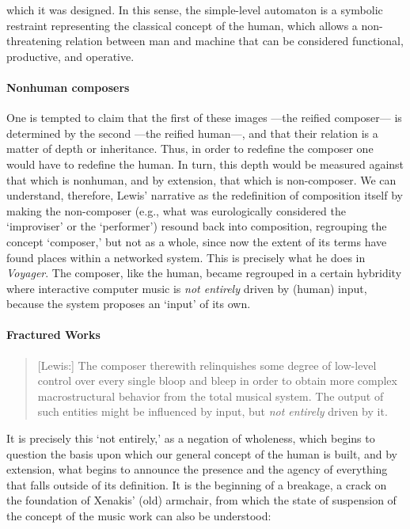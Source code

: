 which it was designed. In this sense, the simple-level automaton is a symbolic restraint representing the classical concept of the human, which allows a non-threatening relation between man and machine that can be considered functional, productive, and operative.

\paragraph{Nonhuman composers}
One is tempted to claim that the first of these images ---the reified composer--- is determined by the second ---the reified human---, and that their relation is a matter of depth or inheritance. Thus, in order to redefine the composer one would have to redefine the human. In turn, this depth would be measured against that which is nonhuman, and by extension, that which is non-composer. We can understand, therefore, Lewis' narrative as the redefinition of composition itself by making the non-composer (e.g., what was eurologically considered the `improviser' or the `performer') resound back into composition, regrouping the concept `composer,' but not as a whole, since now the extent of its terms have found places within a networked system. This is precisely what he does in \textit{Voyager}. The composer, like the human, became regrouped in a certain hybridity where interactive computer music is \textit{not entirely} driven by (human) input, because the system proposes an `input' of its own. 

\paragraph{Fractured Works}

\begin{quote}
	[Lewis:] The composer therewith relinquishes some degree of low-level control over every single bloop and bleep in order to obtain more complex macrostructural behavior from the total musical system. The output of such entities might be influenced by input, but \textit{not entirely} driven by it. \im \parencite[11]{Lew93:Put}
\end{quote}

It is precisely this `not entirely,' as a negation of wholeness, which begins to question the basis upon which our general concept of the human is built, and by extension, what begins to announce the presence and the agency of everything that falls outside of its definition. It is the beginning of a breakage, a crack on the foundation of Xenakis' (old) armchair, from which the state of suspension of the concept of the music work can also be understood:

